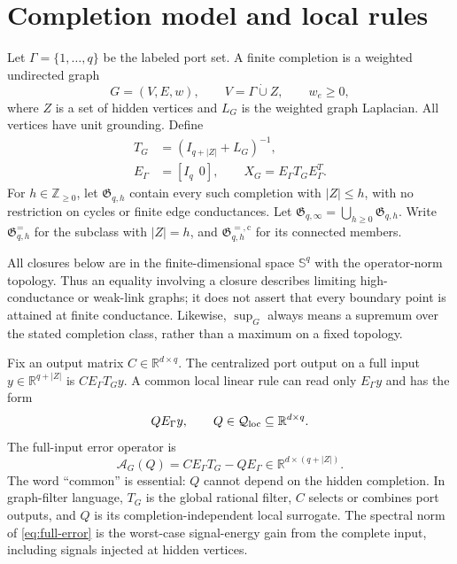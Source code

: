 \documentclass[journal,10pt]{IEEEtran}
\theoremstyle{definition}
\theoremstyle{remark}
\newcommand{\R}{\mathbb R}
\newcommand{\Sph}{\mathbb S}
\newcommand{\cQ}{\mathcal Q}
\newcommand{\cA}{\mathcal A}
\newcommand{\fG}{\mathfrak G}
\begin{document}
\section{Completion model and local rules}

Let $\Gamma=\{1,\ldots,q\}$ be the labeled port set.  A finite completion is a
weighted undirected graph
\[
  G=(V,E,w),\qquad V=\Gamma\mathbin{\dot\cup}Z,\qquad w_e\geq0,
\]
where $Z$ is a set of hidden vertices and $L_G$ is the weighted graph
Laplacian.  All vertices have unit grounding.  Define
\begin{equation}
\begin{aligned}
 T_G&=(I_{q+|Z|}+L_G)^{-1},\\
 E_\Gamma&=[I_q\ \ 0],\qquad
 X_G=E_\Gamma T_GE_\Gamma^T .
\end{aligned}
  \label{eq:TG-XG}
\end{equation}
For $h\in\mathbb Z_{\geq0}$, let $\fG_{q,h}$ contain every such completion with
$|Z|\leq h$, with no restriction on cycles or finite edge conductances.  Let
$\fG_{q,\infty}=\bigcup_{h\geq0}\fG_{q,h}$.  Write
$\fG^{=}_{q,h}$ for the subclass with $|Z|=h$, and
$\fG^{=,\mathrm c}_{q,h}$ for its connected members.

All closures below are in the finite-dimensional space $\Sph^q$ with the
operator-norm topology.  Thus an equality involving a closure describes
limiting high-conductance or weak-link graphs; it does not assert that every
boundary point is attained at finite conductance.  Likewise, $\sup_G$ always
means a supremum over the stated completion class, rather than a maximum on a
fixed topology.

Fix an output matrix $C\in\R^{d\times q}$.  The centralized port output on a
full input $y\in\R^{q+|Z|}$ is $CE_\Gamma T_Gy$.  A common local linear rule can
read only $E_\Gamma y$ and has the form
\begin{equation}
  Q E_\Gamma y,\qquad Q\in\cQ_{\rm loc}\subseteq\R^{d\times q}.
  \label{eq:local-rule}
\end{equation}
The full-input error operator is
\begin{equation}
  \cA_G(Q)=CE_\Gamma T_G-QE_\Gamma
  \in\R^{d\times(q+|Z|)}.
  \label{eq:full-error}
\end{equation}
The word ``common'' is essential: $Q$ cannot depend on the hidden completion.
In graph-filter language, $T_G$ is the global rational filter, $C$ selects or
combines port outputs, and $Q$ is its completion-independent local surrogate.
The spectral norm of \eqref{eq:full-error} is the worst-case signal-energy gain
from the complete input, including signals injected at hidden vertices.
\end{document}
